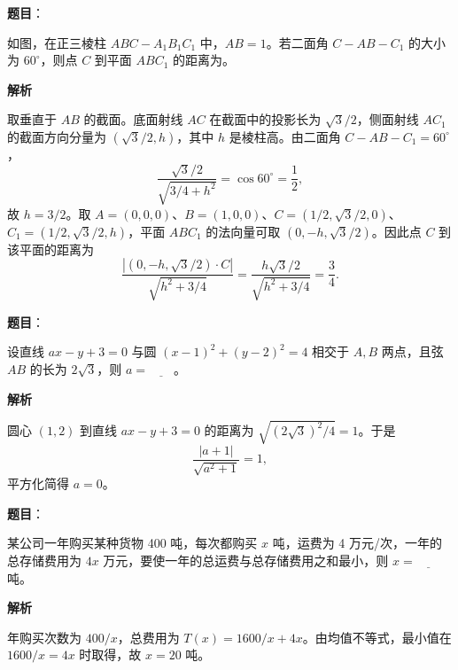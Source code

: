 \begin{answer}

\textbf{题目}：

如图，在正三棱柱 \(ABC-A_1B_1C_1\) 中，\(AB=1\)。若二面角 \(C-AB-C_1\) 的大小为 \(60^\circ\)，则点 \(C\) 到平面 \(ABC_1\) 的距离为\gkblank{}。
\nopagebreak[4]
\begin{center}\end{center}
\nopagebreak[4]
\textbf{解析}

取垂直于 \(AB\) 的截面。底面射线 \(AC\) 在截面中的投影长为 \(\sqrt3/2\)，侧面射线 \(AC_1\) 的截面方向分量为 \((\sqrt3/2,h)\)，其中 \(h\) 是棱柱高。由二面角 \(C-AB-C_1=60^\circ\)，
\nopagebreak[4]
\[
\frac{\sqrt3/2}{\sqrt{3/4+h^2}}=\cos60^\circ=\frac12,
\]
故 \(h=3/2\)。取 \(A=(0,0,0)\)、\(B=(1,0,0)\)、\(C=(1/2,\sqrt3/2,0)\)、\(C_1=(1/2,\sqrt3/2,h)\)，平面 \(ABC_1\) 的法向量可取 \((0,-h,\sqrt3/2)\)。因此点 \(C\) 到该平面的距离为
\nopagebreak[4]
\[
\frac{|(0,-h,\sqrt3/2)\cdot C|}{\sqrt{h^2+3/4}}
=\frac{h\sqrt3/2}{\sqrt{h^2+3/4}}=\frac34.
\]


\end{answer}
\begin{answer}

\textbf{题目}：

设直线 \(ax-y+3=0\) 与圆 \((x-1)^2+(y-2)^2=4\) 相交于 \(A,B\) 两点，且弦 \(AB\) 的长为 \(2\sqrt3\)，则 \(a=\underline{\qquad}\)。

\textbf{解析}

圆心 \((1,2)\) 到直线 \(ax-y+3=0\) 的距离为 \(\sqrt{(2\sqrt3)^2/4}=1\)。于是
\nopagebreak[4]
\[
\frac{|a+1|}{\sqrt{a^2+1}}=1,
\]
平方化简得 \(a=0\)。


\end{answer}
\begin{answer}

\textbf{题目}：

某公司一年购买某种货物 400 吨，每次都购买 \(x\) 吨，运费为 4 万元/次，一年的总存储费用为 \(4x\) 万元，要使一年的总运费与总存储费用之和最小，则 \(x=\underline{\qquad}\) 吨。

\textbf{解析}

年购买次数为 \(400/x\)，总费用为 \(T(x)=1600/x+4x\)。由均值不等式，最小值在 \(1600/x=4x\) 时取得，故 \(x=20\) 吨。


\end{answer}
